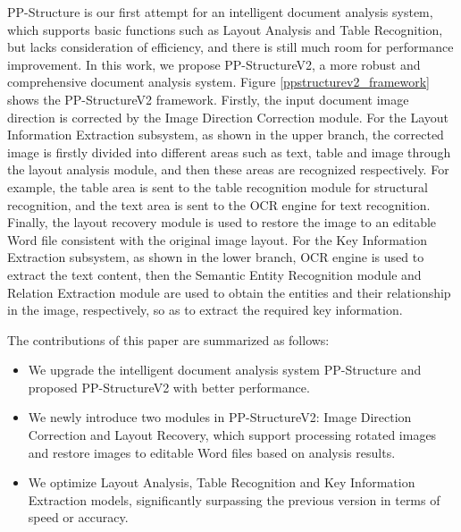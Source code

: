 \documentclass[letterpaper]{article} \usepackage{aaai21}  \usepackage{times}  \usepackage{helvet} \usepackage{courier}  \usepackage[hyphens]{url}  \usepackage{graphicx} \usepackage{algorithm}
\begin{document}
PP-Structure is our first attempt for an intelligent document analysis system, which supports basic functions such as Layout Analysis and Table Recognition, but lacks consideration of efficiency, and there is still much room for performance improvement. In this work, we propose PP-StructureV2, a more robust and comprehensive document analysis system. Figure \ref{ppstructurev2_framework} shows the PP-StructureV2 framework. Firstly, the input document image direction is corrected by the Image Direction Correction module. For the Layout Information Extraction subsystem, as shown in the upper branch, the corrected image is firstly divided into different areas such as text, table and image through the layout analysis module, and then these areas are recognized respectively. For example, the table area is sent to the table recognition module for structural recognition, and the text area is sent to the OCR engine for text recognition. Finally, the layout recovery module is used to restore the image to an editable Word file consistent with the original image layout. For the Key Information Extraction subsystem, as shown in the lower branch, OCR engine is used to extract the text content, then the Semantic Entity Recognition module and Relation Extraction module are used to obtain the entities and their relationship in the image, respectively, so as to extract the required key information.

\begin{figure*}[ht]
\centering
{}
\caption{Framework of the proposed PP-StructureV2. It contains two subsystems: layout information extraction and key information extraction.}
\label{ppstructurev2_framework}
\end{figure*}

The contributions of this paper are summarized as follows:

\begin{itemize}
    \item We upgrade the intelligent document analysis system PP-Structure and proposed PP-StructureV2 with better performance.
    \item We newly introduce two modules in PP-StructureV2: Image Direction Correction and Layout Recovery, which support processing rotated images and restore images to editable Word files based on analysis results.
    \item We optimize Layout Analysis, Table Recognition and Key Information Extraction models, significantly surpassing the previous version in terms of speed or accuracy.
\end{itemize}
\end{document}
